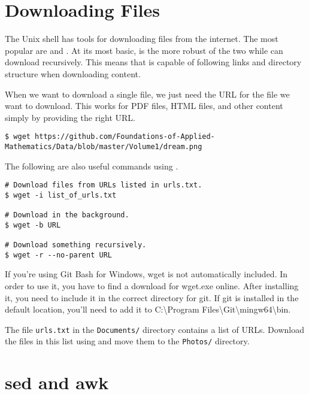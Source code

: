 \section*{Downloading Files} %

The Unix shell has tools for downloading files from the internet.
The most popular are  and .
At its most basic,  is the more robust of the two while  can download recursively. 
This means that  is capable of following links and directory structure when downloading content.

When we want to download a single file, we just need the URL for the file we want to download.
This works for PDF files, HTML files, and other content simply by providing the right URL.

\begin{lstlisting}
$ wget https://github.com/Foundations-of-Applied-Mathematics/Data/blob/master/Volume1/dream.png
\end{lstlisting}

The following are also useful commands using .

\begin{lstlisting}
# Download files from URLs listed in urls.txt.
$ wget -i list_of_urls.txt

# Download in the background.
$ wget -b URL

# Download something recursively.
$ wget -r --no-parent URL
\end{lstlisting}

\begin{warn}
If you're using Git Bash for Windows, wget is not automatically included. In order to use it, you have to find a download for wget.exe online. After installing it, you need to include it in the correct directory for git. If git is installed in the default location, you'll need to add it to C:\textbackslash Program Files\textbackslash Git\textbackslash mingw64\textbackslash bin.
\end{warn}

\begin{problem}
The file \texttt{urls.txt} in the \texttt{Documents/} directory contains a list of URLs.
Download the files in this list using  and move them to the \texttt{Photos/} directory.
\end{problem}

\section*{sed and awk} %

